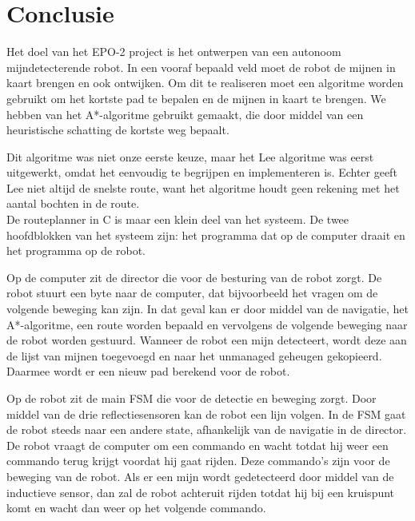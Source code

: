 \documentclass{report}
\begin{document}
\chapter{Conclusie}
\label{ch:conclusie}

Het doel van het EPO-2 project is het ontwerpen van een autonoom mijndetecterende robot. In een vooraf bepaald veld moet de robot de mijnen in kaart brengen en ook ontwijken. 
Om dit te realiseren moet een algoritme worden gebruikt om het kortste pad te bepalen en de mijnen in kaart te brengen. We hebben van het A*-algoritme gebruikt gemaakt, die door middel van een heuristische schatting de kortste weg bepaalt. 

Dit algoritme was niet onze eerste keuze, maar het Lee algoritme was eerst uitgewerkt, omdat het eenvoudig te begrijpen en implementeren is. Echter geeft Lee niet altijd de snelste route, want het algoritme houdt geen rekening met het aantal bochten in de route.\\

De routeplanner in C is maar een klein deel van het systeem. De twee hoofdblokken van het systeem zijn: het programma dat op de computer draait en het programma op de robot.  

Op de computer zit de director die voor de besturing van de robot zorgt. De robot stuurt een byte naar de computer, dat bijvoorbeeld het vragen om de volgende beweging kan zijn. In dat geval kan er door middel van de navigatie, het A*-algoritme, een route worden bepaald en vervolgens de volgende beweging naar de robot worden gestuurd. Wanneer de robot een mijn detecteert, wordt deze aan de lijst van mijnen toegevoegd en naar het unmanaged geheugen gekopieerd. Daarmee wordt er een nieuw pad berekend voor de robot.

Op de robot zit de main FSM die voor de detectie en beweging zorgt. Door middel van de drie reflectiesensoren kan de robot een lijn volgen. In de FSM gaat de robot steeds naar een andere state, afhankelijk van de navigatie in de director. De robot vraagt de computer om een commando en wacht totdat hij weer een commando terug krijgt voordat hij gaat rijden. Deze commando's zijn voor de beweging van de robot. Als er een mijn wordt gedetecteerd door middel van de inductieve sensor, dan zal de robot achteruit rijden totdat hij bij een kruispunt komt en wacht dan weer op het volgende commando.
\end{document}
